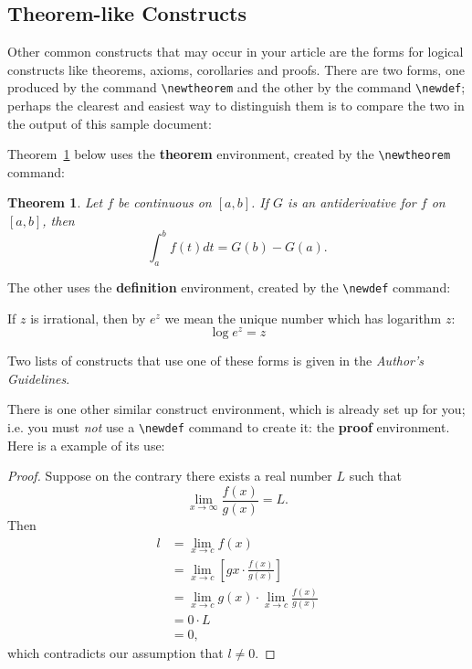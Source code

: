 \documentclass{sig-alternate}
\begin{document}
\subsection{Theorem-like Constructs}
\label{sec:theoremLikeConstructs}

Other common constructs that may occur in your article are
the forms for logical constructs like theorems, axioms,
corollaries and proofs.  There are
two forms, one produced by the
command \texttt{\textbackslash newtheorem} and the
other by the command \texttt{\textbackslash newdef}; perhaps
the clearest and easiest way to distinguish them is
to compare the two in the output of this sample document:

Theorem~\ref{thm:integration} below uses the \textbf{theorem} environment, created by
the \texttt{\textbackslash newtheorem} command:

\newtheorem{theorem}{Theorem}

\begin{theorem}
Let $f$ be continuous on $[a,b]$.  If $G$ is
an antiderivative for $f$ on $[a,b]$, then
\begin{displaymath}\int^b_af(t)dt = G(b) - G(a).\end{displaymath}
\label{thm:integration}
\end{theorem}

The other uses the \textbf{definition} environment, created
by the \texttt{\textbackslash newdef} command:
\begin{definition}
If $z$ is irrational, then by $e^z$ we mean the
unique number which has
logarithm $z$: \begin{displaymath}{\log e^z = z}\end{displaymath}
\end{definition}

Two lists of constructs that use one of these
forms is given in the
\textit{Author's  Guidelines}.
 
There is one other similar construct environment, which is
already set up
for you; i.e. you must \textit{not} use
a \texttt{\textbackslash newdef} command to
create it: the \textbf{proof} environment.  Here
is a example of its use:
\begin{proof}
Suppose on the contrary there exists a real number $L$ such that
\begin{displaymath}
\lim_{x\rightarrow\infty} \frac{f(x)}{g(x)} = L.
\end{displaymath}
Then
\begin{align*}
l &= \lim_{x\rightarrow c} f(x) \\
  &= \lim_{x\rightarrow c}
\left[ g{x} \cdot \frac{f(x)}{g(x)} \right ] \\
  &= \lim_{x\rightarrow c} g(x) \cdot \lim_{x\rightarrow c}
\frac{f(x)}{g(x)}  \\
  &= 0\cdot L  \\
  &= 0,
\end{align*}
which contradicts our assumption that $l\neq 0$.
\end{proof}
\end{document}
